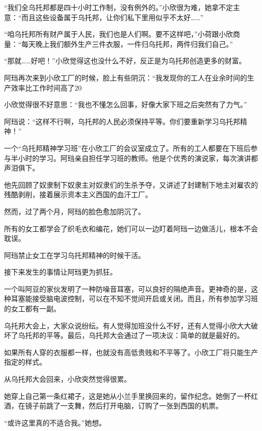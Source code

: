 “我们全乌托邦都是四十小时工作制，没有例外的。”小欣很为难，她拿不定主意：“而且这些设备属于乌托邦，让你们私下里用似乎不太好……” 

“咱乌托邦所有财产属于人民，我们也是人们啊。要不这样吧，”小荷跟小欣商量：“每天晚上我们额外生产三件衣服，一件归乌托邦，两件归我们自己。”

“那就……好吧！”小欣觉得这也没什么不好，反正是为乌托邦创造更多的财富。

\zPar
阿珰再次来到小欣工厂的时候，脸上有些阴沉：“我发现你的工人在业余时间的生产效率比工作时间高了20%

小欣觉得很不好意思：“我也不懂怎么回事，好像大家下班之后突然有了力气。”

阿珰说：“这样不行啊，乌托邦的人民必须保持平等。你们要重新学习乌托邦精神！”

\zPar
一个“乌托邦精神学习班”在小欣工厂的会议室成立了。所有的工人都要在下班后参与半小时的学习。阿珰亲自担任学习班的教师。他是个优秀的演说家，每次演讲都声泪俱下。

他先回顾了奴隶制下奴隶主对奴隶们的生杀予夺，又讲述了封建制下地主对雇农的残酷剥削，接着展示资本主义西国的血汗工厂。

\zPar
然而，过了两个月，阿珰的脸色愈加阴沉了。

所有的女工都学会了织毛衣和编花，她们可以一边盯着阿珰一边做活儿，根本不会耽误。

阿珰禁止女工在学习乌托邦精神的时候干活。

\zPar
接下来发生的事情让阿珰更为抓狂。

一个叫阿豆的家伙发明了一种防噪音耳塞，可以良好的隔绝声音。更神奇的是，这种耳塞能接受脑电波控制，可以在不知不觉间开启或关闭。而且，所有参加学习班的女工都有一副。

乌托邦大会上，大家众说纷纭。有人觉得加班没什么不好，还有人觉得小欣大大破坏了乌托邦的平等。最后，乌托邦大会通过了一项决议：简单的就是最好的。

如果所有人穿的衣服都一样，也就没有高低贵贱和不平等了。小欣工厂将只能生产指定的样式。

\zPar
从乌托邦大会回来，小欣突然觉得很累。

她穿上自己第一条红裙子，这是她从小兰手里换回来的，留作纪念。她倒了一杯红酒，在镜子前跳了一支舞，然后打开电脑，订购了一张到西国的机票。

“或许这里真的不适合我。”她想。 

